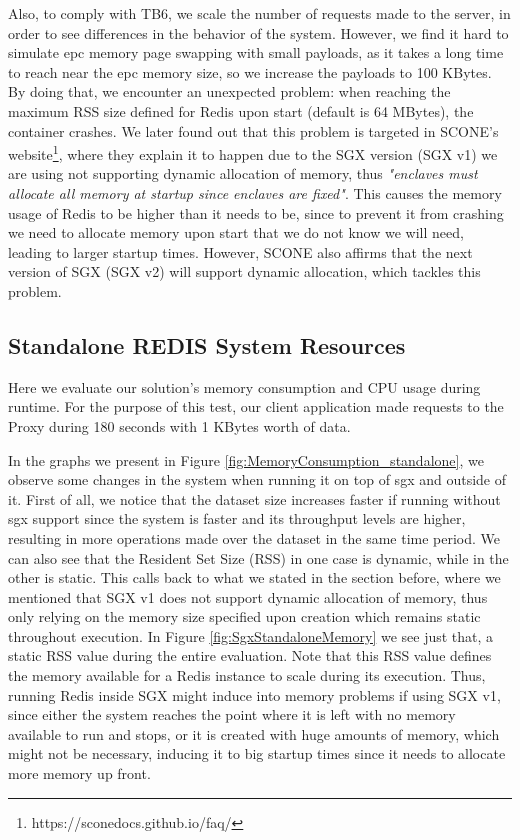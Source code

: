 Also, to comply with TB6, we scale the number of requests made to the server, in order to see differences in the behavior of the system. However, we find it hard to simulate \gls{epc} memory page swapping with small payloads, as it takes a long time to reach near the \gls{epc} memory size, so we increase the payloads to 100 KBytes. By doing that, we encounter an unexpected problem: when reaching the maximum RSS size defined for Redis upon start (default is 64 MBytes), the container crashes. We later found out that this problem is targeted in SCONE's website\footnote{https://sconedocs.github.io/faq/}, where they explain it to happen due to the SGX version (SGX v1) we are using not supporting dynamic allocation of memory, thus \textit{"enclaves must allocate all memory at startup since enclaves are fixed"}. This causes the memory usage of Redis to be higher than it needs to be, since to prevent it from crashing we need to allocate memory upon start that we do not know we will need, leading to larger startup times. However, SCONE also affirms that the next version of SGX (SGX v2) will support dynamic allocation, which tackles this problem. 


\subsection{Standalone REDIS System Resources}
\label{ssec:SingleRedis_MemCPU}

Here we evaluate our solution's memory consumption and CPU usage during runtime. 
For the purpose of this test, our client application made requests to the Proxy during 180 seconds with 1 KBytes worth of data.  

In the graphs we present in Figure \ref{fig:MemoryConsumption_standalone}, we observe some changes in the system when running it on top of \gls{sgx} and outside of it. First of all, we notice that the dataset size increases faster if running without \gls{sgx} support since the system is faster and its throughput levels are higher, resulting in more operations made over the dataset in the same time period. We can also see that the Resident Set Size (RSS) in one case is dynamic, while in the other is static. This calls back to what we stated in the section before, where we mentioned that SGX v1 does not support dynamic allocation of memory, thus only relying on the memory size specified upon creation which remains static throughout execution. In Figure \ref{fig:SgxStandaloneMemory} we see just that, a static RSS value during the entire evaluation. Note that this RSS value defines the memory available for a Redis instance to scale during its execution. Thus, running Redis inside SGX might induce into memory problems if using SGX v1, since either the system reaches the point where it is left with no memory available to run and stops, or it is created with huge amounts of memory, which might not be necessary, inducing it to big startup times since it needs to allocate more memory up front.

